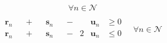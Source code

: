 \documentclass{beamer}
\begin{document}
\begin{frame}
\begin{itemize}
\begin{equation}
\begin{split}
\begin{alignedat}{2}
                    \end{alignedat}
                \quad \forall n \in \mathcal{N}
            \end{split}
        \end{equation}
        \begin{equation}
            \begin{split}
                \begin{alignedat}{8}
                    &&\boldsymbol{r}_{n} && {}+{} &&\boldsymbol{s}_{n} && {}-{} 
                    &&\boldsymbol{u}_{n} &\ge 0\\
                    &&\boldsymbol{r}_{n} && {}+{} &&\boldsymbol{s}_{n} && {}-{} 
                    &2&\boldsymbol{u}_{n} &\le 0\\
                \end{alignedat}
                \quad \forall n \in \mathcal{N}
            \end{split}
        \end{equation}    
    \end{itemize}
\end{frame}
\end{document}

